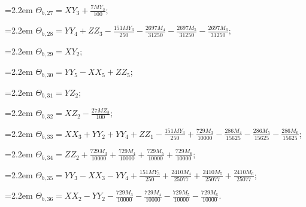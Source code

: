 {\hangindent=2.2em $\Theta_{b,27}=XY_{3}+\tfrac{7MY_{3}}{100}$;\par
\hangindent=2.2em $\Theta_{b,28}=YY_{4}+ZZ_{3}-\tfrac{151MY_{3}}{250}-\tfrac{2697M_{4}}{31250}-\tfrac{2697M_{5}}{31250}-\tfrac{2697M_{6}}{31250}$;\par
\hangindent=2.2em $\Theta_{b,29}=XY_{2}$;\par
\hangindent=2.2em $\Theta_{b,30}=YY_{5}-XX_{5}+ZZ_{5}$;\par
\hangindent=2.2em $\Theta_{b,31}=YZ_{2}$;\par
\hangindent=2.2em $\Theta_{b,32}=XZ_{2}-\tfrac{27MZ_{3}}{100}$;\par
\hangindent=2.2em $\Theta_{b,33}=XX_{3}+YY_{2}+YY_{4}+ZZ_{1}-\tfrac{151MY_{3}}{250}+\tfrac{729M_{3}}{10000}-\tfrac{286M_{4}}{15625}-\tfrac{286M_{5}}{15625}-\tfrac{286M_{6}}{15625}$;\par
\hangindent=2.2em $\Theta_{b,34}=ZZ_{2}+\tfrac{729M_{3}}{10000}+\tfrac{729M_{4}}{10000}+\tfrac{729M_{5}}{10000}+\tfrac{729M_{6}}{10000}$;\par
\hangindent=2.2em $\Theta_{b,35}=YY_{3}-XX_{3}-YY_{4}+\tfrac{151MY_{3}}{250}+\tfrac{2410M_{4}}{25077}+\tfrac{2410M_{5}}{25077}+\tfrac{2410M_{6}}{25077}$;\par
\hangindent=2.2em $\Theta_{b,36}=XX_{2}-YY_{2}-\tfrac{729M_{3}}{10000}-\tfrac{729M_{4}}{10000}-\tfrac{729M_{5}}{10000}-\tfrac{729M_{6}}{10000}$.\par
}
